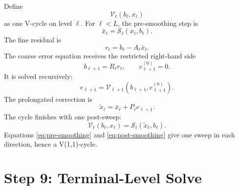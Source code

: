 \documentclass[11pt]{article}
\newcommand{\level}{\ell}
\begin{document}
Define
\begin{equation}
  \mathcal V_\level(b_\level,x_\level)
  \label{eq:vcycle-operator}
\end{equation}
as one V-cycle on level $\level$.  For $\level<L$, the pre-smoothing step is
\begin{equation}
  \bar x_\level
  =
  \mathcal S_\level(x_\level,b_\level).
  \label{eq:pre-smoothing}
\end{equation}
The fine residual is
\begin{equation}
  r_\level
  =
  b_\level-A_\level\bar x_\level.
  \label{eq:level-residual}
\end{equation}
The coarse error equation receives the restricted right-hand side
\begin{equation}
  b_{\level+1}
  =
  R_\level r_\level,
  \qquad
  e_{\level+1}^{(0)}=0.
  \label{eq:residual-restriction}
\end{equation}
It is solved recursively:
\begin{equation}
  e_{\level+1}
  =
  \mathcal V_{\level+1}
  (b_{\level+1},e_{\level+1}^{(0)}).
  \label{eq:recursive-coarse-solve}
\end{equation}
The prolongated correction is
\begin{equation}
  \tilde x_\level
  =
  \bar x_\level+P_\level e_{\level+1}.
  \label{eq:coarse-correction}
\end{equation}
The cycle finishes with one post-sweep:
\begin{equation}
  \mathcal V_\level(b_\level,x_\level)
  =
  \mathcal S_\level(\tilde x_\level,b_\level).
  \label{eq:post-smoothing}
\end{equation}
Equations \eqref{eq:pre-smoothing} and \eqref{eq:post-smoothing} give one sweep
in each direction, hence a V(1,1)-cycle.

\section{Step 9: Terminal-Level Solve}
\end{document}
